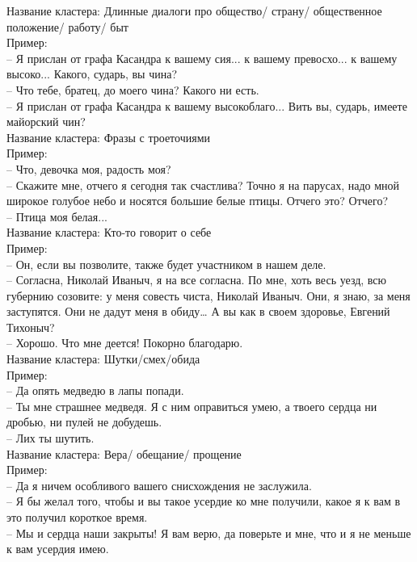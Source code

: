 \documentclass[a4paper,14pt]{article}
\begin{document}
Название кластера: Длинные диалоги про общество/ страну/ общественное положение/ работу/ быт\\
Пример: \\
-- Я прислан от графа Касандра к вашему сия... к вашему превосхо... к вашему высоко...
              Какого, сударь, вы чина? \\
-- Что тебе, братец, до моего чина? Какого ни есть. \\
-- Я прислан от графа Касандра к вашему высокоблаго... Вить вы, сударь, имеете майорский
              чин? \\



Название кластера: Фразы с троеточиями\\
Пример: \\
-- Что, девочка моя, радость моя? \\
-- Скажите мне, отчего я сегодня так счастлива? Точно я на парусах, надо мной широкое
              голубое небо и носятся большие белые птицы. Отчего это? Отчего? \\
-- Птица моя белая... \\



Название кластера: Кто-то говорит о себе\\
Пример: \\
-- Он, если вы позволите, также будет участником в нашем деле. \\
-- Согласна, Николай Иваныч, я на все согласна. По мне, хоть весь уезд, всю губернию
            созовите: у меня совесть чиста, Николай Иваныч. Они, я знаю, за меня заступятся. Они не
            дадут меня в обиду… А вы как в своем здоровье, Евгений Тихоныч? \\
-- Хорошо. Что мне деется! Покорно благодарю. \\



Название кластера: Шутки/смех/обида\\
Пример: \\
-- Да опять медведю в лапы попади. \\
-- Ты мне страшнее медведя. Я с ним оправиться умею, а твоего сердца ни дробью, ни пулей
              не добудешь. \\
-- Лих ты шутить. \\



Название кластера: Вера/ обещание/ прощение\\
Пример: \\
-- Да я ничем особливого вашего снисхождения не заслужила. \\
-- Я бы желал того, чтобы и вы такое усердие ко мне получили, какое я к вам в это
              получил короткое время. \\
-- Мы и сердца наши закрыты! Я вам верю, да поверьте и мне, что и я не меньше к вам
              усердия имею. \\
\end{document}
